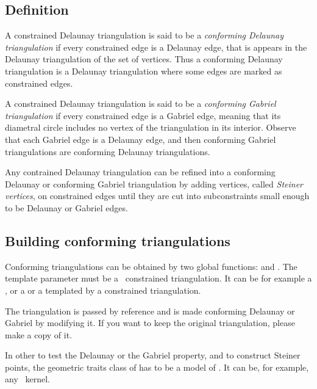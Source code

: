 \subsection{Definition}
\label{sec:Mesh_2_conforming_defition}

A constrained Delaunay triangulation is said to be a \emph{conforming
  Delaunay triangulation} if every constrained edge is a Delaunay
edge, that is appears in the Delaunay triangulation of the set of
vertices. Thus a conforming Delaunay triangulation is a Delaunay
triangulation where some edges are marked as constrained edges.

A constrained Delaunay triangulation is said to be a \emph{conforming
  Gabriel triangulation} if every constrained edge is a Gabriel edge,
meaning that its diametral circle includes no vertex of the
triangulation in its interior. Observe that each Gabriel edge is a
Delaunay edge, and then conforming Gabriel triangulations are
conforming Delaunay triangulations.

Any contrained Delaunay triangulation can be refined into a conforming
Delaunay or conforming Gabriel triangulation by adding vertices,
called \emph{Steiner vertices}, on constrained edges until they are
cut into subconstraints small enough to be Delaunay or Gabriel edges.


\subsection{Building conforming triangulations}
\label{sec:Mesh_2_building_conforming}

Conforming triangulations can be obtained by two global functions:
 and
. The
template parameter  must be a \cgal\ constrained triangulation. It
can be for example a , or a
 or a 
templated by a constrained triangulation.

The triangulation  is passed by reference and is made conforming
Delaunay or Gabriel by modifying it. If you want to keep the original
triangulation, please make a copy of it.

In other to test the Delaunay or the Gabriel property, and to construct
Steiner points, the geometric traits class of  has to be a model of
. It can be, for example, any
\cgal\ kernel.


